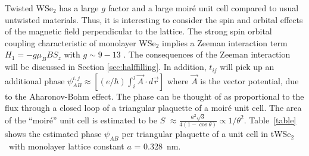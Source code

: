 \documentclass[%
reprint,
superscriptaddress,
twocolumn,
 amsmath,amssymb,
 aps,
 prb,
]{revtex4-2}
\newcommand{\twsetwo}{tWSe$_2$}
\begin{document}


Twisted WSe$_2$ has a large $g$ factor and a large moir\'e unit cell compared to usual untwisted materials. Thus, it is interesting to consider the spin and orbital effects of the magnetic field perpendicular to the lattice. The strong spin orbital coupling characteristic of monolayer WSe$_2$ implies a Zeeman interaction term $H_1=-g \mu_BBS_z$ with $g\sim9-13$ \cite{forste2020exciton, lindlau2018role}. The consequences of the Zeeman interaction will be discussed in Section \ref{sec:halffilling}. In addition, $t_{ij}$ will pick up an additional phase $\psi_{AB}^{i,j} \approx\left[(e / \hbar) \int_{i}^{j} \vec{A} \cdot d \vec{r}\right]$ where $\vec{A}$ is the vector potential, due to the Aharonov-Bohm effect.  The phase can be thought of as  proportional to the flux through a closed loop of a triangular plaquette of a moir\'e unit cell. The area of the ``moir\'e'' unit cell is estimated to be $S$ $\approx\frac{a^{2} \sqrt{3}}{4(1-\cos \theta)}\propto 1/\theta^2$. Table~\ref{table} shows the estimated phase $\psi_{AB}$ per triangular plaquette of a unit cell in \twsetwo~with monolayer lattice constant $a$ = 0.328~nm.  
\end{document}

